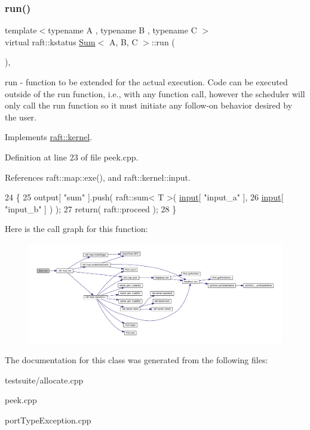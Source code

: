 \subsubsection{\texorpdfstring{run()}{run()}\hspace{0.1cm}{\footnotesize\ttfamily [3/3]}}
{\footnotesize\ttfamily template$<$typename A , typename B , typename C $>$ \\
virtual raft\+::kstatus \hyperlink{class_sum}{Sum}$<$ A, B, C $>$\+::run (\begin{DoxyParamCaption}{ }\end{DoxyParamCaption})\hspace{0.3cm}{\ttfamily [inline]}, {\ttfamily [virtual]}}

run -\/ function to be extended for the actual execution. Code can be executed outside of the run function, i.\+e., with any function call, however the scheduler will only call the run function so it must initiate any follow-\/on behavior desired by the user. 

Implements \hyperlink{classraft_1_1kernel_a05094286d7577360fb1b91c91fc05901}{raft\+::kernel}.



Definition at line 23 of file peek.\+cpp.



References raft\+::map\+::exe(), and raft\+::kernel\+::input.


\begin{DoxyCode}
24    \{
25       output[ \textcolor{stringliteral}{"sum"} ].push( raft::sum< T >( \hyperlink{classraft_1_1kernel_a6edbe35a56409d402e719b3ac36d6554}{input}[ \textcolor{stringliteral}{"input\_a"} ], 
26                                             \hyperlink{classraft_1_1kernel_a6edbe35a56409d402e719b3ac36d6554}{input}[ \textcolor{stringliteral}{"input\_b"} ] ) );
27       \textcolor{keywordflow}{return}( raft::proceed );
28    \}
\end{DoxyCode}
Here is the call graph for this function\+:
\nopagebreak
\begin{figure}[H]
\begin{center}
\leavevmode
\includegraphics[width=350pt]{class_sum_ab915892675d11a8f3f0de2e7f96b0d28_cgraph}
\end{center}
\end{figure}


The documentation for this class was generated from the following files\+:\begin{DoxyCompactItemize}
\item 
testsuite/allocate.\+cpp\item 
peek.\+cpp\item 
port\+Type\+Exception.\+cpp\end{DoxyCompactItemize}
